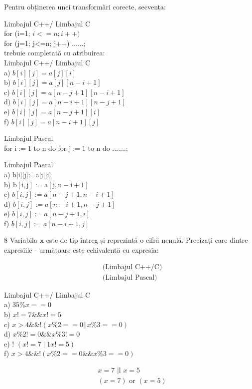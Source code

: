Pentru obținerea unei transformări corecte, secvența:

Limbajul C++/ Limbajul C\\
for (i=1; $i<=n ; i++)$\\
for (j=1; j<=n; j++) ......;\\
trebuie completată cu atribuirea:\\
Limbajul C++/ Limbajul C\\
a) $b[i][j]=a[j][i]$\\
b) $b[i][j]=a[j][n-i+1]$\\
c) $b[i][j]=a[n-j+1][n-i+1]$\\
d) $b[i][j]=a[n-i+1][n-j+1]$\\
e) $b[i][j]=a[n-j+1][i]$\\
f) $b[i][j]=a[n-i+1][j]$

Limbajul Pascal\\
for $\mathrm{i}:=1$ to n do for $\mathrm{j}:=1$ to n do .......;

Limbajul Pascal\\[0pt]
a) b[i][j]:=a[j][i]\\
b) $\mathrm{b}[\mathrm{i}, \mathrm{j}]:=\mathrm{a}[\mathrm{j}, \mathrm{n}-\mathrm{i}+1]$\\
c) $b[i, j]:=a[n-j+1, n-i+1]$\\
d) $b[i, j]:=a[n-i+1, n-j+1]$\\
e) $b[i, j]:=a[n-j+1, i]$\\
f) $b[i, j]:=a[n-i+1, j]$

8 Variabila $\mathbf{x}$ este de tip întreg și reprezintă o cifră nenulă. Precizați care dintre expresiile - următoare este echivalentă cu expresia:

$$
\begin{aligned}
& \text { (Limbajul C++/C) } \\
& \text { (Limbajul Pascal) }
\end{aligned}
$$

Limbajul C++/ Limbajul C\\
a) $35 \% x==0$\\
b) $x!=7 \& \& x!=5$\\
c) $x>4 \& \&!(x \% 2==0| | x \% 3==0)$\\
d) $x \% 2!=0 \& \& x \% 3!=0$\\
e) ! $(x!=7 \mid 1 x!=5)$\\
f) $x>4 \& \&!(x \% 2==0 \& \& x \% 3==0)$

$$
\begin{aligned}
& x=7 \text { |l } x=5 \\
& (x=7) \text { or }(x=5)
\end{aligned}
$$

